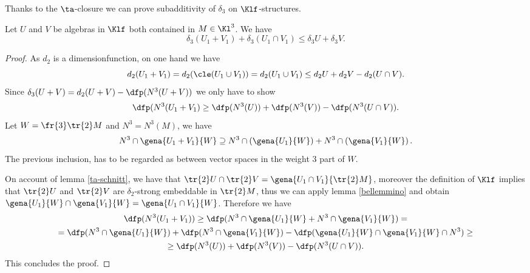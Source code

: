 Thanks to the $\ta$-closure we can prove subadditivity of $\delta_{3}$ on $\Klf$-structures.
\begin{lem}\label{presubatre}
Let $U$ and $V$ be algebras in $\Klf$ both contained in $M\in\Kl^{3}$. We have
$$\delta_3\left(U_{1}+V_{1}\right)+\delta_{3}(U_{1}\cap V_{1})\leq\delta_{3}U+\delta_{3}V.$$
\end{lem}
\begin{proof}
As $d_{2}$ is a dimensionfunction, on one hand we have
$$d_{2}(U_{1}+V_{1})=d_{2}(\cle(U_{1}\cup V_{1}))=d_{2}(U_{1}\cup V_{1})\leq
d_{2}U+d_{2}V-d_{2}(U\cap V).$$
Since $\delta_{3}(U+V)=d_{2}(U+V)-\dfp(N^{3}(U+V))$ we only have to show
$$\dfp(N^{3}(U_{1}+V_{1})\geq\dfp(N^{3}(U))+\dfp(N^{3}(V))-\dfp(N^{3}(U\cap V)).$$
Let $W=\fr{3}\tr{2}M$ and $N^{3}=N^{3}(M)$, we have
$$
N^{3}\cap\gena{U_{1}+V_{1}}{W}\supseteq
N^{3}\cap\left(\gena{U_{1}}{W}\right)+N^{3}\cap\left(\gena{V_{1}}{W}\right).
$$
The previous inclusion, has to be regarded as
between vector spaces in the weight $3$ part of $W$.

On account of lemma \ref{ta-schnitt}, we have that $\tr{2}U\cap\tr{2}V=\gena{U_{1}\cap V_{1}}{\tr{2}M}$,
moreover the definition of $\Klf$ implies that $\tr{2}U$ and $\tr{2}V$ are $\delta_{2}$-strong
embeddable in $\tr{2}M$, thus we can apply lemma \ref{bellemmino} and obtain
$\gena{U_{1}}{W}\cap\gena{V_{1}}{W}=\gena{U_{1}\cap V_{1}}{W}$.
Therefore we have
\begin{multline*}
\dfp(N^{3}(U_{1}+V_{1}))\geq\dfp(N^{3}\cap\gena{U_{1}}{W}+N^{3}\cap\gena{V_{1}}{W})=\\
=\dfp(N^{3}\cap\gena{U_{1}}{W})+\dfp(N^{3}\cap\gena{V_{1}}{W})-\dfp(\gena{U_{1}}{W}\cap\gena{V_{1}}{W}
\cap N^{3})\geq\\
\geq\dfp(N^{3}(U))+\dfp(N^{3}(V))-\dfp(N^{3}(U\cap V)).
\end{multline*}
This concludes the proof.
\end{proof}

